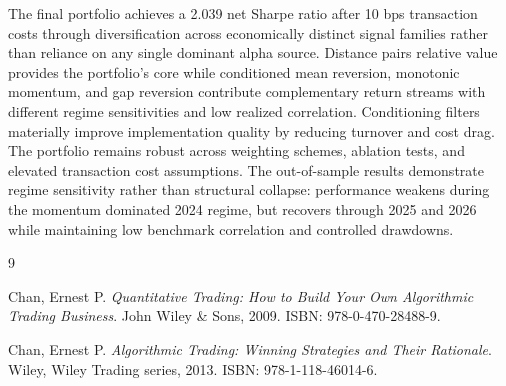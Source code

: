 \documentclass{article}
\begin{document}
The final portfolio achieves a 2.039 net Sharpe ratio after 10 bps transaction costs through diversification across economically distinct signal families rather than reliance on any single dominant alpha source. Distance pairs relative value provides the portfolio’s core while conditioned mean reversion, monotonic momentum, and gap reversion contribute complementary return streams with different regime sensitivities and low realized correlation. Conditioning filters materially improve implementation quality by reducing turnover and cost drag. The portfolio remains robust across weighting schemes, ablation tests, and elevated transaction cost assumptions. The out-of-sample results demonstrate regime sensitivity rather than structural collapse: performance weakens during the momentum dominated 2024 regime, but recovers through 2025 and 2026 while maintaining low benchmark correlation and controlled drawdowns.

\begin{thebibliography}{9}

Chan, Ernest P.
\textit{Quantitative Trading: How to Build Your Own Algorithmic Trading Business}.
John Wiley \& Sons, 2009.
ISBN: 978-0-470-28488-9.

Chan, Ernest P.
\textit{Algorithmic Trading: Winning Strategies and Their Rationale}.
Wiley, Wiley Trading series, 2013.
ISBN: 978-1-118-46014-6.

\end{thebibliography}
\end{document}
